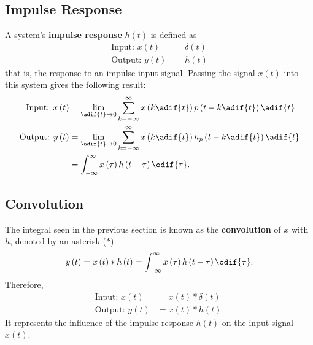 \documentclass{article}
\begin{document}
\subsection{Impulse Response}
A system's \textbf{impulse response} \(h\left( t \right)\) is defined
as
\begin{align*}
    \text{Input: } x\left( t \right)  & = \delta\left( t \right) \\
    \text{Output: } y\left( t \right) & = h\left( t \right)
\end{align*}
that is, the response to an impulse input signal.
Passing the signal \(x\left( t \right)\) into this system gives the
following result:
\begin{align*}
    \text{Input: } x\left( t \right)  & = \lim_{\adif{t} \to 0} \sum_{k = -\infty}^\infty x\left( k \adif{t} \right) p\left( t - k \adif{t} \right) \adif{t}   \\
    \text{Output: } y\left( t \right) & = \lim_{\adif{t} \to 0} \sum_{k = -\infty}^\infty x\left( k \adif{t} \right) h_p\left( t - k \adif{t} \right) \adif{t} \\
                                      & = \int_{-\infty}^\infty x\left( \tau \right) h\left( t - \tau \right) \odif{\tau}.
\end{align*}
\subsection{Convolution}
The integral seen in the previous section is known as the
\textbf{convolution} of \(x\) with \(h\), denoted by an asterisk
(\(\ast\)).
\begin{equation*}
    y\left( t \right) = x\left( t \right) * h\left( t \right) = \int_{-\infty}^\infty x\left( \tau \right) h\left( t - \tau \right) \odif{\tau}.
\end{equation*}
Therefore,
\begin{align*}
    \text{Input: } x\left( t \right)  & = x\left( t \right) * \delta\left( t \right) \\
    \text{Output: } y\left( t \right) & = x\left( t \right) * h\left( t \right).
\end{align*}
It represents the influence of the impulse response \(h\left( t \right)\)
on the input signal \(x\left( t \right)\).
\end{document}
